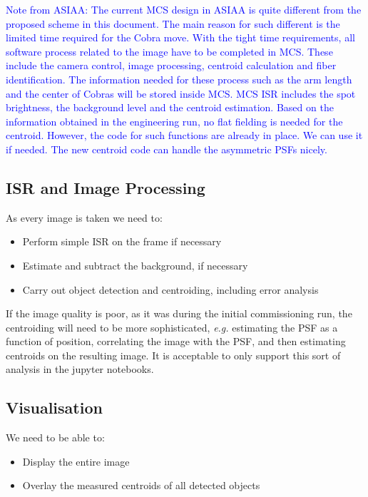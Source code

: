 \documentclass[12pt]{article}
\newcommand{\eg}{\textit{e.g.}\xspace}
\newcommand{\jupyter}{\gls{jupyter}\xspace}
\begin{document}
\textcolor{blue}{
Note from ASIAA:  The current MCS design in ASIAA is quite different from the proposed
scheme in this document. The main reason for such different is the
limited time required for the Cobra move. With the tight time
requirements, all software process related to the image have to be
completed in MCS. These include the camera control, image processing,
centroid calculation and fiber identification. The information needed
for these process such as the arm length and the center of Cobras will
be stored inside MCS.
MCS ISR includes the spot brightness, the background level and the
centroid estimation. Based on the information obtained in the
engineering run, no flat fielding is needed for the centroid. However,
the code for such functions are already in place. We can use it if
needed. The new centroid code can handle the asymmetric PSFs nicely.
}


\subsection{ISR and Image Processing}

As every image is taken we need to:
\begin{itemize}
  \item Perform simple \gls{ISR} on the frame if necessary
  \item Estimate and subtract the background, if necessary
  \item Carry out object detection and centroiding, including error analysis
\end{itemize}

If the image quality is poor, as it was during the initial commissioning run, the centroiding will
need to be more sophisticated, \eg estimating the \gls{PSF} as a function of position, correlating
the image with the \gls{PSF}, and then estimating centroids on the resulting image.  It is
acceptable to only support this sort of analysis in the \jupyter notebooks.

\subsection{Visualisation}

We need to be able to:
\begin{itemize}
\item Display the entire image
\item Overlay the measured centroids of all detected objects
\end{itemize}
\end{document}

